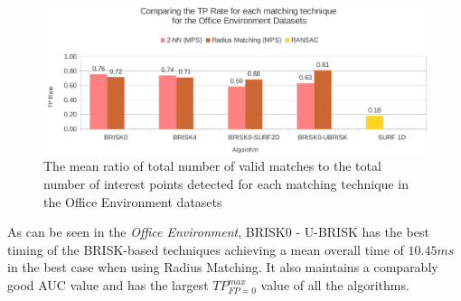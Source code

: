 \documentclass[11pt]{report}
\begin{document}
%

\begin{figure}
  \centering
    \includegraphics[width=1.0\textwidth]{../Drawings/Graphs/tp_rate_oe.pdf}
    \caption{The mean ratio of total number of valid matches to the total number of interest points detected for each matching technique in the Office Environment datasets} 
    \label{fig:tp_rate_oe}
\end{figure}

As can be seen in the \textit{Office Environment}, BRISK0 - U-BRISK has the best timing of the BRISK-based techniques achieving a mean overall time of $10.45 ms$ in the best case when using Radius Matching. It also maintains a comparably good AUC value and has the largest $TP_{FP=0}^{max}$ value of all the algorithms.\\  
\end{document}
